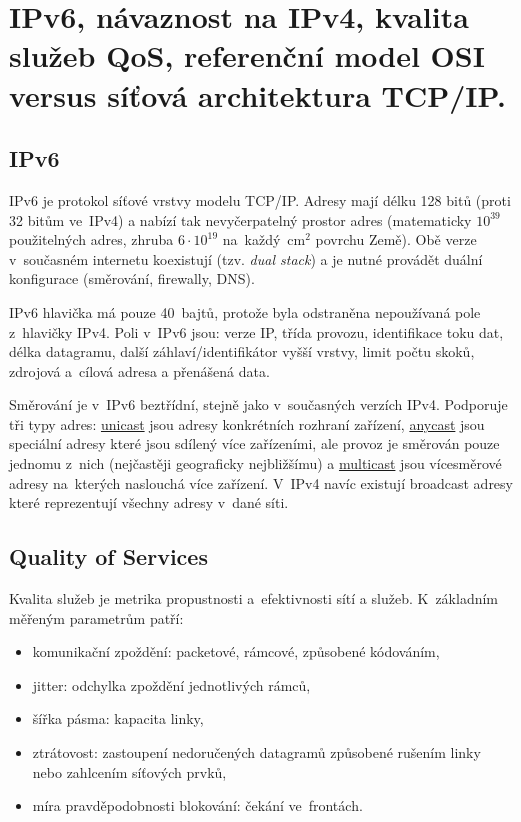 \clearpage
\section{IPv6, návaznost na IPv4, kvalita služeb QoS, referenční model OSI versus síťová architektura TCP/IP.}


\subsection{IPv6}

IPv6 je protokol síťové vrstvy modelu TCP/IP.
Adresy mají délku 128 bitů (proti 32 bitům ve~IPv4) a nabízí tak nevyčerpatelný prostor adres (matematicky $10^{39}$ použitelných adres, zhruba $6 \cdot 10^{19}$ na~každý~cm$^2$ povrchu Země).
Obě verze v~současném internetu koexistují (tzv. \emph{dual stack}) a je nutné provádět duální konfigurace (směrování, firewally, DNS).

IPv6 hlavička má pouze 40~bajtů, protože byla odstraněna nepoužívaná pole z~hlavičky IPv4.
Poli v~IPv6 jsou: verze IP, třída provozu, identifikace toku dat, délka datagramu, další záhlaví/identifikátor vyšší vrstvy, limit počtu skoků, zdrojová a~cílová adresa a přenášená data.

Směrování je v~IPv6 beztřídní, stejně jako v~současných verzích IPv4.
Podporuje tři typy adres: \underline{unicast} jsou adresy konkrétních rozhraní zařízení, \underline{anycast} jsou speciální adresy které jsou sdílený více zařízeními, ale provoz je směrován pouze jednomu z~nich (nejčastěji geograficky nejbližšímu) a \underline{multicast} jsou vícesměrové adresy na~kterých naslouchá více zařízení.
V~IPv4 navíc existují broadcast adresy které reprezentují všechny adresy v~dané síti.


\subsection{Quality of Services}

Kvalita služeb je metrika propustnosti a~efektivnosti sítí a služeb.
K~základním měřeným parametrům patří:
\begin{itemize}
    \item komunikační zpoždění: packetové, rámcové, způsobené kódováním,
    \item jitter: odchylka zpoždění jednotlivých rámců,
    \item šířka pásma: kapacita linky,
    \item ztrátovost: zastoupení nedoručených datagramů způsobené rušením linky nebo zahlcením síťových prvků,
    \item míra pravděpodobnosti blokování: čekání ve~frontách.
\end{itemize}

